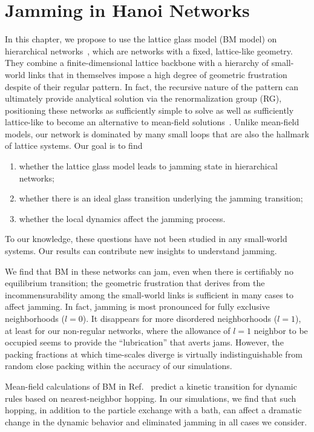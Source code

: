 
\chapter{Jamming in Hanoi Networks}
\label{chap-jamming}

In this chapter, we propose to use the lattice glass model (BM model) on hierarchical
networks~\cite{Boettcher2008HN}, which are networks with a fixed,
lattice-like geometry. They combine a finite-dimensional lattice backbone
with a hierarchy of small-world links that in themselves impose a
high degree of geometric frustration despite of their regular pattern.
In fact, the recursive nature of the pattern can ultimately provide
analytical solution via the renormalization group (RG), positioning
these networks as sufficiently simple to solve as well as sufficiently
lattice-like to become an alternative to mean-field solutions~\cite{BoHa11}. 
Unlike mean-field models, our network is dominated by many small loops that are also the hallmark of lattice systems. Our goal is to find 
\begin{enumerate}
\item whether the lattice glass model leads to jamming
state in hierarchical networks;
\item whether there is an ideal glass
transition underlying the jamming transition;
\item whether the local dynamics affect the jamming process. 
\end{enumerate}
To our knowledge, these questions have not been studied in any small-world systems. Our results can contribute new insights to understand jamming.

We find that BM in these networks can jam, even when there is certifiably
no equilibrium transition; the geometric frustration that derives
from the incommensurability among the small-world links is sufficient
in many cases to affect jamming. In fact, jamming is most pronounced
for fully exclusive neighborhoods ($l=0$). It disappears for more
disordered neighborhoods ($l=1$), at least for our non-regular networks,
where the allowance of $l=1$ neighbor to be occupied seems to provide
the ``lubrication'' that averts jams. However, the packing fractions
at which time-scales diverge is virtually indistinguishable from random
close packing within the accuracy of our simulations. 

Mean-field calculations of BM in Ref.~\cite{Rivoire03} predict a kinetic transition for dynamic rules based on nearest-neighbor hopping. In our simulations, we find that  such hopping,  in addition to the particle exchange with a bath, can affect a dramatic change in the dynamic behavior and eliminated jamming in all cases we consider.  

